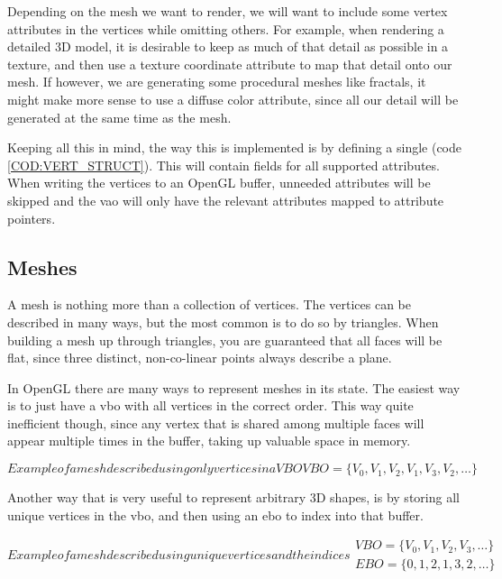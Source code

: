 Depending on the mesh we want to render,
we will want to include some vertex attributes in the vertices while omitting others.
For example,
when rendering a detailed 3D model,
it is desirable to keep as much of that detail as possible in a texture,
and then use a texture coordinate attribute to map that detail onto our mesh.
If however,
we are generating some procedural meshes like fractals,
it might make more sense to use a diffuse color attribute,
since all our detail will be generated at the same time as the mesh.

Keeping all this in mind,
the way this is implemented is by defining a single  (code \ref{COD:VERT_STRUCT}).
This  will contain fields for all supported attributes.
When writing the vertices to an OpenGL buffer,
unneeded attributes will be skipped and the \ac{vao} will only have the relevant attributes mapped to attribute pointers.


\subsection{Meshes}

A mesh is nothing more than a collection of vertices.
The vertices can be described in many ways,
but the most common is to do so by triangles.
When building a mesh up through triangles,
you are guaranteed that all faces will be flat,
since three distinct,
non-co-linear points always describe a plane.

In OpenGL there are many ways to represent meshes in its state.
The easiest way is to just have a \ac{vbo} with all vertices in the correct order.
This way quite inefficient though,
since any vertex that is shared among multiple faces will appear multiple times in the buffer,
taking up valuable space in memory.

\begin{equation}[EQ:VBO]{Example of a mesh described using only vertices in a VBO}
\boxed{VBO = \{ V_0, V_1, V_2, V_1, V_3, V_2, \dots \}}
\end{equation}

Another way that is very useful to represent arbitrary 3D shapes,
is by storing all unique vertices in the \ac{vbo},
and then using an \ac{ebo} to index into that buffer.

\begin{equation}[EQ:VBO_EBO]{Example of a mesh described using unique vertices and the indices}
  \boxed{
    \begin{matrix}
      VBO = \{ V_0, V_1, V_2, V_3, \dots \} \\
      EBO = \{ 0, 1, 2, 1, 3, 2, \dots \}
    \end{matrix}
  }
\end{equation}

